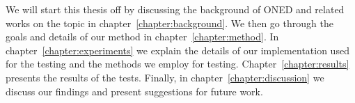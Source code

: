 We will start this thesis off by discussing the background of ONED and related works on the topic in chapter~\ref{chapter:background}. We then go through the goals and details of our method in chapter~\ref{chapter:method}. In chapter~\ref{chapter:experiments} we explain the details of our implementation used for the testing and the methods we employ for testing. Chapter~\ref{chapter:results} presents the results of the tests. Finally, in chapter~\ref{chapter:discussion} we discuss our findings and present suggestions for future work.

